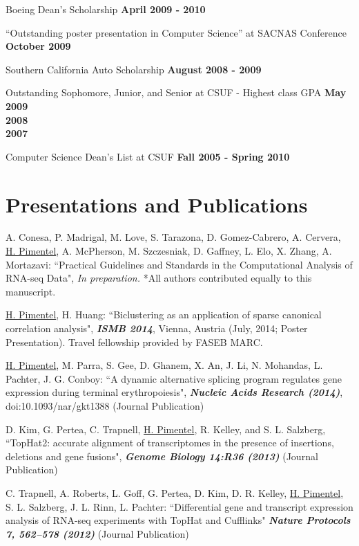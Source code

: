 \documentclass[margin,line]{res}
\begin{document}
\begin{resume}
Boeing Dean's Scholarship \hfill {\bf April 2009 - 2010}

``Outstanding poster presentation in Computer Science'' at SACNAS
Conference \hfill {\bf October 2009}

Southern California Auto Scholarship \hfill {\bf August 2008 - 2009}

\vspace*{1.5mm}
Outstanding Sophomore, Junior, and Senior at CSUF - Highest class GPA
\hfill {\bf May 2009}
\\
\hspace*{2cm} \hfill \textbf{2008} \\  
\hspace*{2cm} \hfill \textbf{2007}

\vspace*{1.5mm}
Computer Science Dean's List at CSUF \hfill {\bf Fall 2005 - Spring 2010}

\section{\sc Presentations and Publications}

A. Conesa, P. Madrigal, M. Love, S. Tarazona, D. Gomez-Cabrero, A. Cervera,
\underline{H. Pimentel}, A. McPherson, M. Szczesniak, D. Gaffney, L. Elo, X.
Zhang, A. Mortazavi: ``Practical Guidelines and Standards in the Computational
Analysis of RNA-seq Data", {\emph{In preparation.}} *All authors contributed
equally to this manuscript.

\underline{H. Pimentel}, H. Huang: ``Biclustering as an application of sparse
canonical correlation analysis", {\bf \emph{ISMB 2014}}, Vienna, Austria (July,
2014; Poster Presentation). Travel fellowship provided by FASEB MARC. 

\underline{H. Pimentel}, M. Parra, S. Gee, D. Ghanem, X. An, J. Li, N.
Mohandas, L. Pachter, J. G. Conboy: ``A dynamic alternative splicing program
regulates gene expression during terminal erythropoiesis", {\bf \emph{Nucleic
    Acids Research (2014)}}, doi:10.1093/nar/gkt1388 (Journal Publication)

D. Kim, G. Pertea, C. Trapnell, \underline{H. Pimentel}, R. Kelley, and S.
L. Salzberg, ``TopHat2: accurate alignment of transcriptomes in the presence of
insertions, deletions and gene fusions", {\bf \emph{Genome Biology
    14:R36 (2013)}} (Journal Publication)

C. Trapnell, A. Roberts, L. Goff, G. Pertea, D. Kim, D. R. Kelley,
\underline{H. Pimentel}, S. L. Salzberg, J. L. Rinn, L. Pachter: ``Differential
gene and transcript expression analysis of RNA-seq experiments with TopHat and
Cufflinks" {\bf \emph{Nature Protocols 7, 562–578 (2012)}} (Journal Publication)


\end{resume}
\end{document}
